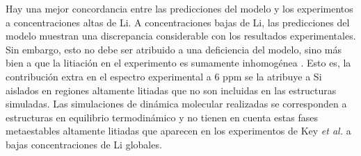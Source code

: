 Hay una mejor concordancia entre las predicciones del modelo y los experimentos
a concentraciones altas de Li. A concentraciones bajas de Li, las predicciones del 
modelo muestran una discrepancia considerable con los resultados experimentales.
Sin embargo, esto no debe ser atribuido a una deficiencia del modelo, sino más 
bien a que la litiación en el experimento es sumamente inhomogénea \cite{key2009}.
Esto es, la contribución extra en el espectro experimental a 6 ppm se la atribuye 
a Si aislados en regiones altamente litiadas que no son incluidas en las 
estructuras simuladas. Las simulaciones de dinámica molecular realizadas se 
corresponden a estructuras en equilibrio termodinámico y no tienen en cuenta estas 
fases metaestables altamente litiadas que aparecen en los experimentos de Key 
\textit{et al.} \cite{key2009} a bajas concentraciones de Li globales.
